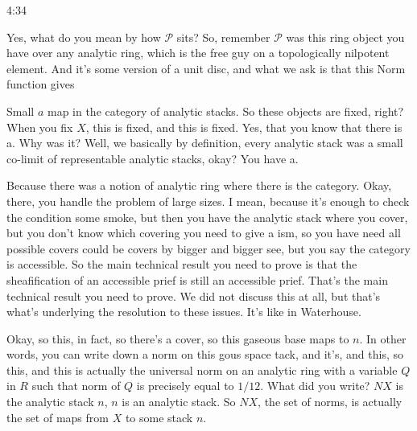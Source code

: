 \begin{unfinished}{4:34}
\begin{example}
\begin{example}
\begin{example}
Yes, what do you mean by how $\mathcal{P}$ sits? So, remember $\mathcal{P}$ was this ring object you have over any analytic ring, which is the free guy on a topologically nilpotent element. And it's some version of a unit disc, and what we ask is that this Norm function gives

Small $a$ map in the category of analytic stacks. So these objects are fixed, right? When you fix $X$, this is fixed, and this is fixed. Yes, that you know that there is a. Why was it? Well, we basically by definition, every analytic stack was a small co-limit of representable analytic stacks, okay? You have a.

Because there was a notion of analytic ring where there is the category. Okay, there, you handle the problem of large sizes. I mean, because it's enough to check the condition some smoke, but then you have the analytic stack where you cover, but you don't know which covering you need to give a ism, so you have need all possible covers could be covers by bigger and bigger see, but you say the category is accessible. So the main technical result you need to prove is that the sheafification of an accessible prief is still an accessible prief. That's the main technical result you need to prove. We did not discuss this at all, but that's what's underlying the resolution to these issues. It's like in Waterhouse.

Okay, so this, in fact, so there's a cover, so this gaseous base maps to $n$. In other words, you can write down a norm on this gous space tack, and it's, and this, so this, and this is actually the universal norm on an analytic ring with a variable $Q$ in $R$ such that norm of $Q$ is precisely equal to $1/12$. What did you write? $NX$ is the analytic stack $n$, $n$ is an analytic stack. So $NX$, the set of norms, is actually the set of maps from $X$ to some stack $n$.


\end{example}
\end{example}
\end{example}
\end{unfinished}

